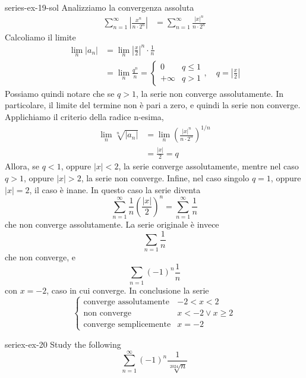 \documentclass[preview]{standalone}
\begin{document}
\begin{snippetsolution}{series-ex-19-sol}{}
    Analizziamo la convergenza assoluta
    \begin{align*}
        \sum_{n=1}^\infty \left|\frac{x^n}{n\cdot 2^n}\right|
        &= \sum_{n=1}^\infty \frac{{|x|}^n}{n\cdot 2^n}
    \end{align*}
    Calcoliamo il limite
    \begin{align*}
        \lim_n |a_n| &= \lim_n {\left|\frac{x}{2}\right|}^n \cdot \frac{1}{n}
        \\
        &= \lim_n \frac{q^n}{n} = \begin{cases}
            0 & q \leq 1 \\
            +\infty & q > 1
        \end{cases}, \quad q = \left|\frac{x}{2}\right|
    \end{align*}
    Possiamo quindi notare che se \(q>1\), la serie non converge assolutamente.
    In particolare, il limite del termine non è pari a zero, e quindi la serie non converge.
    Applichiamo il criterio della radice n-esima,
    \begin{align*}
        \lim_n \sqrt[n]{|a_n|} &= \lim_n {\left(
            \frac{{|x|}^n}{n\cdot 2^n}
        \right)}^{1/n} \\
        &= \frac{|x|}{2} = q
    \end{align*}
    Allora, se \(q<1\), oppure \(|x| < 2\), la serie converge assolutamente,
    mentre nel caso \(q>1\), oppure \(|x| > 2\), la serie non converge.
    Infine, nel caso singolo \(q=1\), oppure \(|x| = 2\),
    il caso è inane. In questo caso la serie diventa
    \[
        \sum_{n=1}^\infty \frac{1}{n} {\left(\frac{|x|}{2}\right)}^n
        = \sum_{n=1}^\infty \frac{1}{n}
    \]
    che non converge assolutamente.
    La serie originale è invece
    \[
        \sum_{n=1} \frac{1}{n}
    \]
    che non converge, e
    \[
        \sum_{n=1} {(-1)}^n \frac{1}{n}
    \]
    con \(x=-2\), caso in cui converge.
    In conclusione la serie
    \[
        \begin{cases}
            \text{converge assolutamente} & -2 < x < 2 \\
            \text{non converge} & x < -2 \lor x \geq 2 \\
            \text{converge semplicemente} & x = -2
        \end{cases}
    \]
\end{snippetsolution}

\begin{snippetexercise}{seriex-ex-20}{}
    Study the following \series
    \[
        \sum_{n=1}^\infty {(-1)}^n \frac{1}{\sqrt[2024]{n}}
    \]
\end{snippetexercise}
\end{document}
